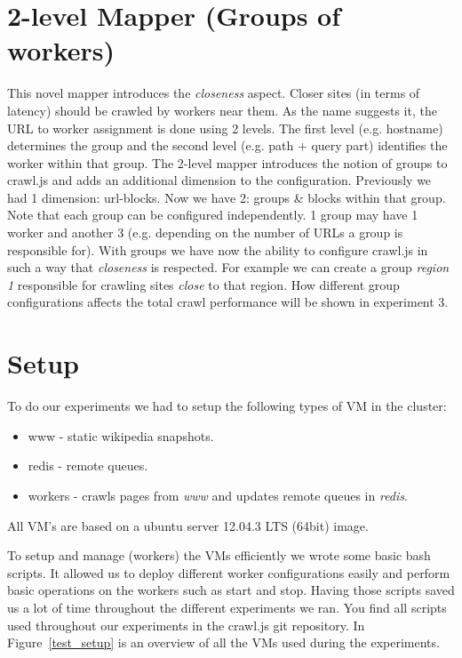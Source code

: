 \section{2-level Mapper (Groups of workers)}
This novel mapper introduces the \emph{closeness} aspect. Closer sites (in terms of latency) should be crawled by workers near them. 
\newline
As the name suggests it, the URL to worker assignment is done using 2 levels. The first level (e.g. hostname) determines the group and the second level (e.g. path + query part) identifies the worker within that group. The 2-level mapper introduces the notion of groups to crawl.js and adds an additional dimension to the configuration. Previously we had 1 dimension: url-blocks. Now we have 2: groups \& blocks within that group. Note that each group can be configured independently. 1 group may have 1 worker and another 3 (e.g. depending on the number of URLs a group is responsible for).
\newline
With groups we have now the ability to configure crawl.js in such a way that \emph{closeness} is respected. For example we can create a group \emph{region 1} responsible for crawling sites \emph{close} to that region. How different group configurations affects the total crawl performance will be shown in experiment 3.

\section{Setup}
To do our experiments we had to setup the following types of VM in the cluster:
\begin{itemize}
\item www - static wikipedia snapshots.
\item redis - remote queues.
\item workers - crawls pages from \emph{www} and updates remote queues in \emph{redis}.
\end{itemize}
All VM's are based on a ubuntu server 12.04.3 LTS (64bit) image.

To setup and manage (workers) the VMs efficiently we wrote some basic bash scripts. It allowed us to deploy different worker configurations easily and perform basic operations on the workers such as start and stop. Having those scripts saved us a lot of time throughout the different experiments we ran. You find all scripts used throughout our experiments in the crawl.js git repository. In Figure~\ref{test_setup} is an overview of all the VMs used during the experiments.


